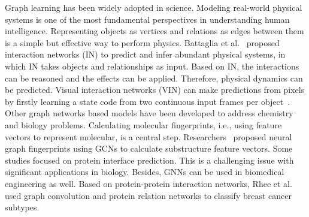 Graph learning has been widely adopted in science. Modeling real-world physical systems is one of the most fundamental perspectives in understanding human intelligence. Representing objects as vertices and relations as edges between them is a simple but effective way to perform physics. Battaglia et al.~ proposed interaction networks (IN) to predict and infer abundant physical systems, in which IN takes objects and relationships as input. Based on IN, the interactions can be reasoned and the effects can be applied. Therefore, physical dynamics can be predicted. Visual interaction networks (VIN) can make predictions from pixels by firstly learning a state code from two continuous input frames per object~.
Other graph networks based models have been developed to address chemistry and biology problems. Calculating molecular fingerprints, i.e., using feature vectors to represent molecular, is a central step. Researchers~ proposed neural graph fingerprints using GCNs to calculate substructure feature vectors. Some studies focused on protein interface prediction. This is a challenging issue with significant applications in biology. Besides, GNNs can be used in biomedical engineering as well. Based on protein-protein interaction networks, Rhee et al.~ used graph convolution and protein relation networks to classify breast cancer subtypes.

